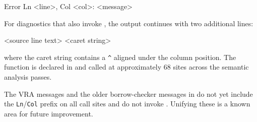 \begin{ccode}
[EXXX] Error Ln <line>, Col <col>: <message>
\end{ccode}

\pnum
For diagnostics that also invoke , the output
continues with two additional lines:

\begin{ccode}
    <source line text>
    <caret string>
\end{ccode}

\noindent
where the caret string contains a \texttt{\^{}} aligned under the column
position.  The function  is declared in
 and called at approximately 68 sites across the semantic
analysis passes.

\pnum
The VRA messages and the older borrow-checker messages in
 do not yet include the \texttt{Ln}/\texttt{Col}
prefix on all call sites and do not invoke .
Unifying these is a known area for future improvement.
